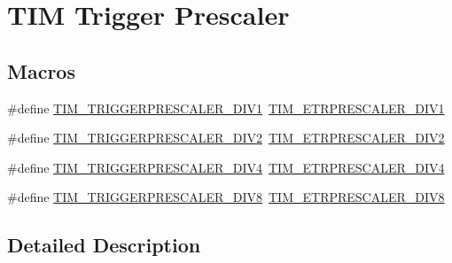 \hypertarget{group___t_i_m___trigger___prescaler}{\section{T\-I\-M Trigger Prescaler}
\label{group___t_i_m___trigger___prescaler}
}
\subsection*{Macros}
\begin{DoxyCompactItemize}
\item 
\#define \hyperlink{group___t_i_m___trigger___prescaler_ga02ab6f24e367cd972a1e0c1df326a7a3}{T\-I\-M\-\_\-\-T\-R\-I\-G\-G\-E\-R\-P\-R\-E\-S\-C\-A\-L\-E\-R\-\_\-\-D\-I\-V1}~\hyperlink{group___t_i_m___e_t_r___prescaler_gabead5364c62645592e42545ba09ab88a}{T\-I\-M\-\_\-\-E\-T\-R\-P\-R\-E\-S\-C\-A\-L\-E\-R\-\_\-\-D\-I\-V1}
\item 
\#define \hyperlink{group___t_i_m___trigger___prescaler_ga1350c5659a17a66df69b444871907d83}{T\-I\-M\-\_\-\-T\-R\-I\-G\-G\-E\-R\-P\-R\-E\-S\-C\-A\-L\-E\-R\-\_\-\-D\-I\-V2}~\hyperlink{group___t_i_m___e_t_r___prescaler_gaf7fe49f67bdb6b33b9b41953fee75680}{T\-I\-M\-\_\-\-E\-T\-R\-P\-R\-E\-S\-C\-A\-L\-E\-R\-\_\-\-D\-I\-V2}
\item 
\#define \hyperlink{group___t_i_m___trigger___prescaler_ga195dd56e15ea4733e19518fb431dfb8d}{T\-I\-M\-\_\-\-T\-R\-I\-G\-G\-E\-R\-P\-R\-E\-S\-C\-A\-L\-E\-R\-\_\-\-D\-I\-V4}~\hyperlink{group___t_i_m___e_t_r___prescaler_gaa09da30c3cd28f1fe6b6f3f599a5212c}{T\-I\-M\-\_\-\-E\-T\-R\-P\-R\-E\-S\-C\-A\-L\-E\-R\-\_\-\-D\-I\-V4}
\item 
\#define \hyperlink{group___t_i_m___trigger___prescaler_ga78edbcf4caf228de0daa4b7f698f578f}{T\-I\-M\-\_\-\-T\-R\-I\-G\-G\-E\-R\-P\-R\-E\-S\-C\-A\-L\-E\-R\-\_\-\-D\-I\-V8}~\hyperlink{group___t_i_m___e_t_r___prescaler_ga834e38200874cced108379b17a24d0b7}{T\-I\-M\-\_\-\-E\-T\-R\-P\-R\-E\-S\-C\-A\-L\-E\-R\-\_\-\-D\-I\-V8}
\end{DoxyCompactItemize}


\subsection{Detailed Description}


